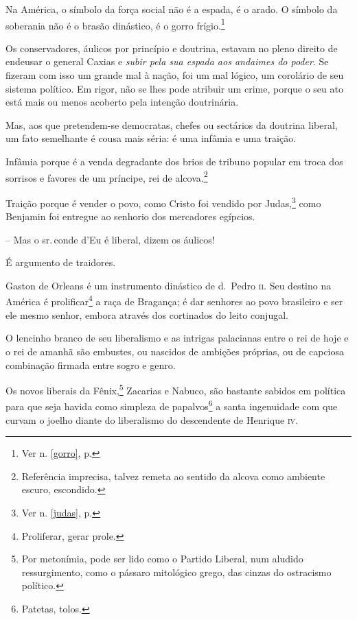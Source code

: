 Na América, o símbolo da força social não é a espada, é o arado. O
símbolo da soberania não é o brasão dinástico, é o gorro
frígio.\footnote{Ver n. \ref{gorro}, p. \pageref{gorro}}

Os conservadores, áulicos por princípio e doutrina, estavam no pleno
direito de endeusar o general Caxias e \emph{subir pela sua espada aos
andaimes do poder}. Se fizeram com isso um grande mal à nação, foi um
mal lógico, um corolário de seu sistema político. Em rigor, não se lhes
pode atribuir um crime, porque o seu ato está mais ou menos acoberto
pela intenção doutrinária.

Mas, aos que pretendem-se democratas, chefes ou sectários da doutrina
liberal, um fato semelhante é cousa mais séria: é uma infâmia e uma
traição.

Infâmia porque é a venda degradante dos brios de tribuno popular em
troca dos sorrisos e favores de um príncipe, rei de alcova.\footnote{
  Referência imprecisa, talvez remeta ao sentido da alcova como ambiente
  escuro, escondido.}

Traição porque é vender o povo, como Cristo foi vendido por
Judas,\footnote{Ver n. \ref{judas}, p. \pageref{judas}} como Benjamin foi
entregue ao senhorio dos mercadores egípcios.

-- Mas o sr.\,conde d'Eu é liberal, dizem os áulicos!

É argumento de traidores.

Gaston de Orleans é um instrumento dinástico de d.~Pedro \textsc{ii}. Seu destino
na América é prolificar\footnote{Proliferar, gerar prole.} a raça de
Bragança; é dar senhores ao povo brasileiro e ser ele mesmo senhor,
embora através dos cortinados do leito conjugal.

O lencinho branco de seu liberalismo e as intrigas palacianas entre o
rei de hoje e o rei de amanhã são embustes, ou nascidos de ambições
próprias, ou de capciosa combinação firmada entre sogro e genro.

Os novos liberais da Fênix,\footnote{Por metonímia, pode ser lido como
  o Partido Liberal, num aludido ressurgimento, como o pássaro
  mitológico grego, das cinzas do ostracismo político.} Zacarias e
Nabuco, são bastante sabidos em política para que seja havida como
simpleza de papalvos\footnote{Patetas, tolos.} a santa ingenuidade com
que curvam o joelho diante do liberalismo do descendente de Henrique \textsc{iv}.

